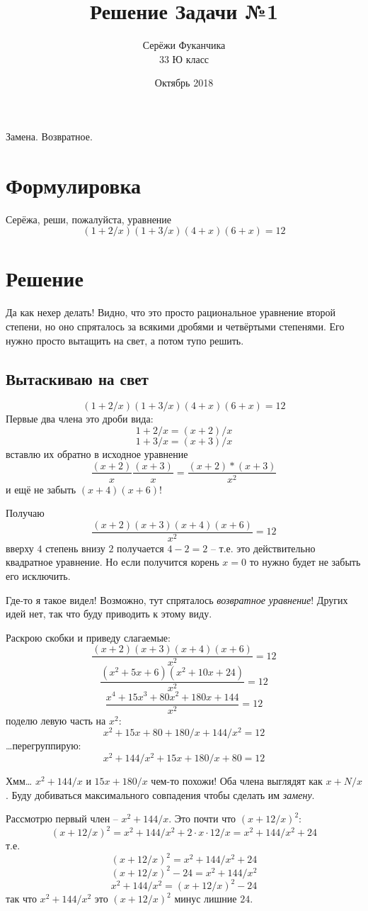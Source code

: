 \documentclass{article}
\title{Решение Задачи №1}
\author{Серёжи Фуканчика\\33 Ю класс}
\date{Октябрь 2018}
\begin{document}
\maketitle
Замена. Возвратное.
\section{Формулировка}
Серёжа, реши, пожалуйста, уравнение
$$(1+2/x)(1+3/x)(4+x)(6+x)=12$$

\section{Решение}

Да как нехер делать! Видно, что это просто рациональное уравнение второй степени, но оно спряталось за всякими дробями и четвёртыми степенями. Его нужно просто вытащить на свет, а потом тупо решить.

\subsection{Вытаскиваю на свет}
$$(1+2/x)(1+3/x)(4+x)(6+x)=12$$
Первые два члена это дроби вида:
$$1+2/x = (x+2)/x$$
$$1+3/x = (x+3)/x$$
вставлю их обратно в исходное уравнение
$$\frac{(x+2)}{x}\frac{(x+3)}{x}=\frac{(x+2)*(x+3)}{x^2}$$
и ещё не забыть $(x+4)(x+6)$!

Получаю
$$\frac{(x+2)(x+3)(x+4)(x+6)}{x^2}=12$$
вверху $4$ степень внизу $2$ получается $4-2=2$ -- т.е. это действительно квадратное уравнение.
Но если получится корень $x=0$ то нужно будет не забыть его исключить.

Где-то я такое видел! Возможно, тут спряталось \textit{возвратное уравнение}! Других идей нет, так что буду приводить к этому виду.

\begin{samepage}
Раскрою скобки и приведу слагаемые:
$$\frac{(x+2)(x+3)(x+4)(x+6)}{x^2}=12$$
$$\frac{(x^2+5x+6)(x^2+10x+24)}{x^2}=12$$
$$ \frac{x^4+15x^3+80x^2+180x+144}{x^2}=12 $$
поделю левую часть на $x^2$:
$$ x^2+15x+80+180/x+144/x^2=12 $$
\ldots{}перегруппирую:
$$ x^2+144/x^2+15x+180/x+80=12 $$
\end{samepage}
Хмм\ldots{} ${x^2+144/x}$ и ${15x+180/x}$ чем-то похожи! Оба члена выглядят как ${x+N/x}$. Буду добиваться максимального совпадения чтобы сделать им \textit{замену}.

\begin{samepage}
Рассмотрю первый член -- ${x^2+144/x}$. Это почти что ${(x+12/x)^2}$:
$$(x+12/x)^2=x^2+144/x^2+2 \cdot x \cdot 12/x=x^2+144/x^2+24 $$
т.е.
$$(x+12/x)^2=x^2+144/x^2+24$$
$$(x+12/x)^2-24=x^2+144/x^2$$
$$x^2+144/x^2=(x+12/x)^2-24$$
так что $ x^2+144/x^2$ это $(x+12/x)^2$ минус лишние $24$.
\end{samepage}
\end{document}
